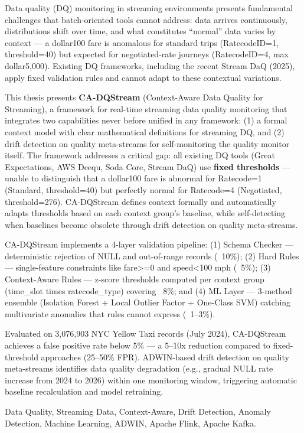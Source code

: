\documentclass[a4paper, reqno, oneside]{book}
\begin{document}
\noindent Data quality (DQ) monitoring in streaming environments presents fundamental challenges that batch-oriented tools cannot address: data arrives continuously, distributions shift over time, and what constitutes ``normal'' data varies by context --- a dollar100 fare is anomalous for standard trips (RatecodeID=1, threshold=40) but expected for negotiated-rate journeys (RatecodeID=4, max dollar5,000). Existing DQ frameworks, including the recent Stream DaQ (2025), apply fixed validation rules and cannot adapt to these contextual variations.

This thesis presents \textbf{CA-DQStream} (Context-Aware Data Quality for Streaming), a framework for real-time streaming data quality monitoring that integrates two capabilities never before unified in any framework: (1) a formal context model with clear mathematical definitions for streaming DQ, and (2) drift detection on quality meta-streams for self-monitoring the quality monitor itself. The framework addresses a critical gap: all existing DQ tools (Great Expectations, AWS Deequ, Soda Core, Stream DaQ) use \textbf{fixed thresholds} --- unable to distinguish that a dollar100 fare is abnormal for Ratecode=1 (Standard, threshold=40) but perfectly normal for Ratecode=4 (Negotiated, threshold=276). CA-DQStream defines context formally and automatically adapts thresholds based on each context group's baseline, while self-detecting when baselines become obsolete through drift detection on quality meta-streams.

CA-DQStream implements a 4-layer validation pipeline: (1) Schema Checker --- deterministic rejection of NULL and out-of-range records (~10\%); (2) Hard Rules --- single-feature constraints like fare>=0 and speed<100 mph (~5\%); (3) Context-Aware Rules --- z-score thresholds computed per context group (time\_slot times ratecode\_type) covering ~8\%; and (4) ML Layer --- 3-method ensemble (Isolation Forest + Local Outlier Factor + One-Class SVM) catching multivariate anomalies that rules cannot express (~1--3\%).

Evaluated on 3,076,903 NYC Yellow Taxi records (July 2024), CA-DQStream achieves a false positive rate below 5\% --- a 5--10x reduction compared to fixed-threshold approaches (25--50\% FPR). ADWIN-based drift detection on quality meta-streams identifies data quality degradation (e.g., gradual NULL rate increase from 2024 to 2026) within one monitoring window, triggering automatic baseline recalculation and model retraining.

\vspace{2cm}
 Data Quality, Streaming Data, Context-Aware, Drift Detection, Anomaly Detection, Machine Learning, ADWIN, Apache Flink, Apache Kafka.
\end{document}
